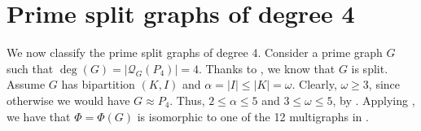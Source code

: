 \documentclass[11pt]{article}
\begin{document}

\section{Prime split graphs of degree 4}\label{sec_deg=4}

We now classify the prime split graphs of degree 4. Consider a prime graph $G$ such that $\deg(G) = |\mathcal{Q}_G(P_4)| = 4$. Thanks to  , we know that $G$ is split. Assume $G$ has bipartition $(K,I)$ and $\alpha = |I| \leq |K| = \omega$. Clearly, $\omega \geq 3$, since otherwise we would have $G\approx P_4$. Thus, $2 \leq \alpha \leq 5$ and $3 \leq \omega \leq 5$, by . Applying , we have that $\Phi = \Phi(G)$ is isomorphic to one of the 12 multigraphs in  .
\end{document}
